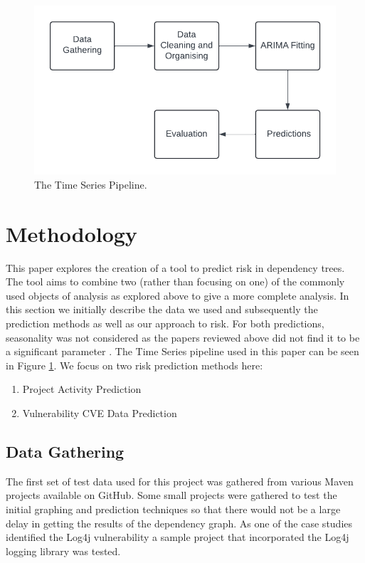 \documentclass[conference]{IEEEtran}
\begin{document}
\begin{figure}
\begin{center}
    \includegraphics[scale=0.5]{Pipeline.png}
    \caption{The Time Series Pipeline.}
    \label{fig:pipeline}
\end{center}
\end{figure}

\section{Methodology}
This paper explores the creation of a tool to predict risk in dependency trees. The tool aims to combine two (rather than focusing on one) of the commonly used objects of analysis as explored above to give a more complete analysis. In this section we initially describe the data we used and subsequently the prediction methods as well as our approach to risk. For both predictions, seasonality was not considered as the papers reviewed above did not find it to be a significant parameter \cite{roumani_time_2015}. The Time Series pipeline used in this paper can be seen in Figure \ref{fig:pipeline}. We focus on two risk prediction methods here: 
\begin{enumerate}
    \item Project Activity Prediction
    \item Vulnerability CVE Data Prediction
\end{enumerate}

\subsection{Data Gathering}
The first set of test data used for this project was gathered from various Maven projects available on GitHub. Some small projects were gathered to test the initial graphing and prediction techniques so that there would not be a large delay in getting the results of the dependency graph. As one of the case studies identified the Log4j vulnerability a sample project that incorporated the Log4j logging library was tested. 
\end{document}
